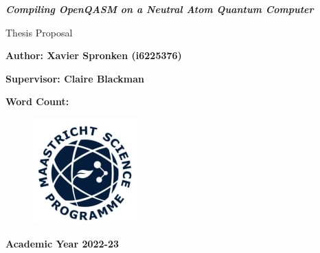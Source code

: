 \documentclass[12pt]{article}
\begin{document}
\begin{titlepage}
    \begin{center}
        \textbf{}
        \vspace{3cm}
        
        \LARGE
        \textbf{\textit{Compiling OpenQASM on a Neutral Atom Quantum Computer}}
        
        \vspace{1cm}
        Thesis Proposal
        
        \vspace{0.7cm}
        \textbf{Author: Xavier Spronken (i6225376)}
        
        \vspace{0.5cm}
        \normalsize
        
        \vspace{1cm}
        \large
        \textbf{Supervisor: Claire Blackman}
        
        \vspace{1cm}
        \textbf{Word Count: }
        
        \vfill
        
        \begin{figure}[H]
            \centering
            \includegraphics{Images/msp-logo.jpeg}
            \label{fig:msp-logo}
        \end{figure}
        
        \vspace{0.5cm}
        \textbf{Academic Year 2022-23}
        
    \end{center}
\end{titlepage}

\tableofcontents

\newpage






\newpage

 
\end{document}
